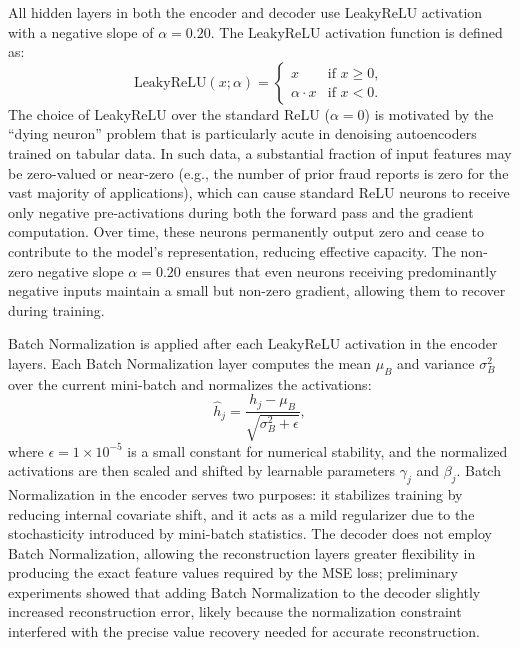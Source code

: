 All hidden layers in both the encoder and decoder use LeakyReLU activation with a negative slope of $\alpha = 0.20$. The LeakyReLU activation function is defined as:
\begin{equation}
\text{LeakyReLU}(x; \alpha) = \begin{cases} x & \text{if } x \geq 0, \\ \alpha \cdot x & \text{if } x < 0. \end{cases}
\label{eq:leaky-relu}
\end{equation}
The choice of LeakyReLU over the standard ReLU ($\alpha = 0$) is motivated by the ``dying neuron'' problem that is particularly acute in denoising autoencoders trained on tabular data. In such data, a substantial fraction of input features may be zero-valued or near-zero (e.g., the number of prior fraud reports is zero for the vast majority of applications), which can cause standard ReLU neurons to receive only negative pre-activations during both the forward pass and the gradient computation. Over time, these neurons permanently output zero and cease to contribute to the model's representation, reducing effective capacity. The non-zero negative slope $\alpha = 0.20$ ensures that even neurons receiving predominantly negative inputs maintain a small but non-zero gradient, allowing them to recover during training.

Batch Normalization is applied after each LeakyReLU activation in the encoder layers. Each Batch Normalization layer computes the mean $\mu_B$ and variance $\sigma_B^2$ over the current mini-batch and normalizes the activations:
\begin{equation}
\hat{h}_j = \frac{h_j - \mu_B}{\sqrt{\sigma_B^2 + \epsilon}},
\label{eq:batchnorm}
\end{equation}
where $\epsilon = 1 \times 10^{-5}$ is a small constant for numerical stability, and the normalized activations are then scaled and shifted by learnable parameters $\gamma_j$ and $\beta_j$. Batch Normalization in the encoder serves two purposes: it stabilizes training by reducing internal covariate shift, and it acts as a mild regularizer due to the stochasticity introduced by mini-batch statistics. The decoder does not employ Batch Normalization, allowing the reconstruction layers greater flexibility in producing the exact feature values required by the MSE loss; preliminary experiments showed that adding Batch Normalization to the decoder slightly increased reconstruction error, likely because the normalization constraint interfered with the precise value recovery needed for accurate reconstruction.

